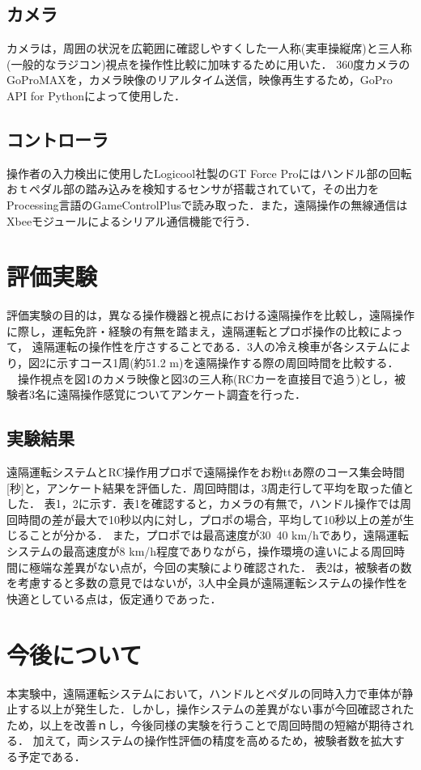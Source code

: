 \documentclass[a4paper,10pt,twocolumn]{jsarticle}
\begin{document}
\subsection{カメラ}
カメラは，周囲の状況を広範囲に確認しやすくした一人称(実車操縦席)と三人称(一般的なラジコン)視点を操作性比較に加味するために用いた．
360度カメラのGoProMAXを，カメラ映像のリアルタイム送信，映像再生するため，GoPro API for Pythonによって使用した．
\subsection{コントローラ}
操作者の入力検出に使用したLogicool社製のGT Force Proにはハンドル部の回転おｔペダル部の踏み込みを検知するセンサが搭載されていて，その出力を
Processing言語のGameControlPlusで読み取った．また，遠隔操作の無線通信はXbeeモジュールによるシリアル通信機能で行う．
\section{評価実験}
評価実験の目的は，異なる操作機器と視点における遠隔操作を比較し，遠隔操作に際し，運転免許・経験の有無を踏まえ，遠隔運転とプロポ操作の比較によって，
遠隔運転の操作性を庁さすることである．3人の冷え検車が各システムにより，図2に示すコース1周(約51.2 m)を遠隔操作する際の周回時間を比較する．
　操作視点を図1のカメラ映像と図3の三人称(RCカーを直接目で追う)とし，被験者3名に遠隔操作感覚についてアンケート調査を行った．
\subsection{実験結果}
遠隔運転システムとRC操作用プロポで遠隔操作をお粉ttあ際のコース集会時間[秒]と，アンケート結果を評価した．周回時間は，3周走行して平均を取った値とした．
表1，2に示す．表1を確認すると，カメラの有無で，ハンドル操作では周回時間の差が最大で10秒以内に対し，プロポの場合，平均して10秒以上の差が生じることが分かる．
また，プロポでは最高速度が30~40 km/hであり，遠隔運転システムの最高速度が8 km/h程度でありながら，操作環境の違いによる周回時間に極端な差異がない点が，今回の実験により確認された．
表2は，被験者の数を考慮すると多数の意見ではないが，3人中全員が遠隔運転システムの操作性を快適としている点は，仮定通りであった．
\section{今後について}
本実験中，遠隔運転システムにおいて，ハンドルとペダルの同時入力で車体が静止する以上が発生した．しかし，操作システムの差異がない事が今回確認されたため，以上を改善ｎし，今後同様の実験を行うことで周回時間の短縮が期待される．
加えて，両システムの操作性評価の精度を高めるため，被験者数を拡大する予定である．
\end{document}
